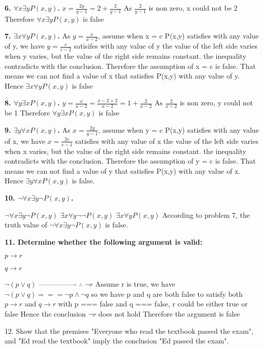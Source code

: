 \documentclass{article}
\begin{document}
\textbf{6. $\forall x \exists yP(x,y)$.}
$x = \frac{2y}{y-1} = 2 + \frac{2}{y-1}$
As $\frac{2}{y-1}$ is non zero, x could not be 2
Therefore $\forall x \exists yP(x,y)$ is false

\textbf{7. $\exists x \forall yP(x,y)$.}
As $y = \frac{x}{x-2}$, 
assume when x = c P(x,y) satisfies with any value of y, 
we have $y = \frac{c}{c-2}$ satisifes with any value of y
the value of the left side varies when y varies, 
but the value of the right side remains constant.
the inequality contradicts with the conclusion.
Therefore the assumption of x = c is false.
That means we can not find a value of x that satisfies P(x,y) with any value of y.
Hence $\exists x \forall yP(x,y)$ is false

\textbf{8. $\forall y \exists xP(x,y)$.}
$y = \frac{x}{x-2} = \frac{x-2+2}{x-2} = 1 + \frac{2}{x-2}$ 
As $\frac{2}{x-2}$ is non zero, y could not be 1
Therefore $\forall y \exists xP(x,y)$ is false

\textbf{9. $\exists y \forall xP(x,y)$.}
As $x = \frac{2y}{y-1}$, 
assume when y = c P(x,y) satisfies with any value of x,
we have $x = \frac{2c}{c-1}$ satisfies with any value of x
the value of the left side varies when x varies,
but the value of the right side remains constant.
the inequality contradicts with the conclusion.
Therefore the assumption of y = c is false.
That means we can not find a value of y that satisfies P(x,y) with any value of x.
Hence $\exists y \forall xP(x,y)$ is false.

\textbf{10. $\lnot \forall x \exists y \lnot P(x,y)$.}

$\lnot \forall x \exists y \lnot P(x,y)$
$\exists x \forall y \lnot \lnot P(x,y)$
$\exists x \forall y P(x,y)$
According to problem 7, the truth value of $\lnot \forall x \exists y \lnot P(x,y)$ is false.

\textbf{11. Determine whether the following argument is valid:}

\textbf{$p \to r$}

\textbf{$q \to r$}

\textbf{$\lnot (p \lor q)$}
----------------
$\therefore$ $\lnot r$
Assume r is true, 
we have $\lnot (p \lor q) === \lnot p \land \lnot q$ so we have p and q are both false
to satisfy both {$p \to r$} and {$q \to r$} with p === false and q === false,
r could be either true or false
Hence the conclusion $\lnot r$ does not hold
Therefore the argument is false

12. Show that the premises "Everyone who read the textbook passed the exam", and "Ed read the textbook" imply the conclusion "Ed passed the exam".
\end{document}

